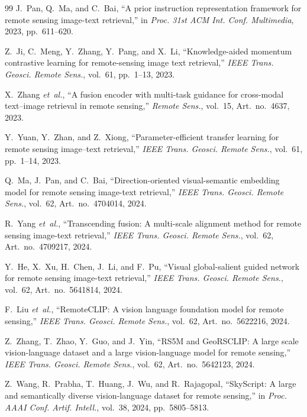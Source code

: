 \documentclass[conference]{IEEEtran}
\begin{document}
\begin{thebibliography}{99}
J.~Pan, Q.~Ma, and C.~Bai, ``A prior instruction representation framework for remote sensing image-text retrieval,'' in \emph{Proc. 31st ACM Int. Conf. Multimedia}, 2023, pp.~611--620.

Z.~Ji, C.~Meng, Y.~Zhang, Y.~Pang, and X.~Li, ``Knowledge-aided momentum contrastive learning for remote-sensing image text retrieval,'' \emph{IEEE Trans. Geosci. Remote Sens.}, vol.~61, pp.~1--13, 2023.

X.~Zhang \emph{et~al.}, ``A fusion encoder with multi-task guidance for cross-modal text--image retrieval in remote sensing,'' \emph{Remote Sens.}, vol.~15, Art.~no.~4637, 2023.

Y.~Yuan, Y.~Zhan, and Z.~Xiong, ``Parameter-efficient transfer learning for remote sensing image--text retrieval,'' \emph{IEEE Trans. Geosci. Remote Sens.}, vol.~61, pp.~1--14, 2023.

Q.~Ma, J.~Pan, and C.~Bai, ``Direction-oriented visual-semantic embedding model for remote sensing image-text retrieval,'' \emph{IEEE Trans. Geosci. Remote Sens.}, vol.~62, Art.~no.~4704014, 2024.

R.~Yang \emph{et~al.}, ``Transcending fusion: A multi-scale alignment method for remote sensing image-text retrieval,'' \emph{IEEE Trans. Geosci. Remote Sens.}, vol.~62, Art.~no.~4709217, 2024.

Y.~He, X.~Xu, H.~Chen, J.~Li, and F.~Pu, ``Visual global-salient guided network for remote sensing image-text retrieval,'' \emph{IEEE Trans. Geosci. Remote Sens.}, vol.~62, Art.~no.~5641814, 2024.

F.~Liu \emph{et~al.}, ``RemoteCLIP: A vision language foundation model for remote sensing,'' \emph{IEEE Trans. Geosci. Remote Sens.}, vol.~62, Art.~no.~5622216, 2024.

Z.~Zhang, T.~Zhao, Y.~Guo, and J.~Yin, ``RS5M and GeoRSCLIP: A large scale vision-language dataset and a large vision-language model for remote sensing,'' \emph{IEEE Trans. Geosci. Remote Sens.}, vol.~62, Art.~no.~5642123, 2024.

Z.~Wang, R.~Prabha, T.~Huang, J.~Wu, and R.~Rajagopal, ``SkyScript: A large and semantically diverse vision-language dataset for remote sensing,'' in \emph{Proc. AAAI Conf. Artif. Intell.}, vol.~38, 2024, pp.~5805--5813.


\end{thebibliography}
\end{document}
